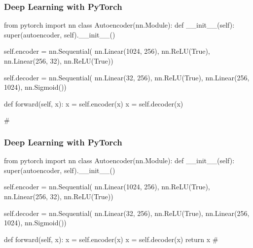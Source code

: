 \documentclass{beamer}
\begin{document}
\begin{frame}[fragile]\frametitle{Deep Learning with PyTorch} 
    \begin{pythoncode}
        from pytorch import nn
        class Autoencoder(nn.Module):
            def __init__(self):
                super(autoencoder, self).__init__()

                self.encoder = nn.Sequential(
                    nn.Linear(1024, 256),
                    nn.ReLU(True),
                    nn.Linear(256, 32),
                    nn.ReLU(True))

                self.decoder = nn.Sequential(
                    nn.Linear(32, 256),
                    nn.ReLU(True),
                    nn.Linear(256, 1024),
                    nn.Sigmoid())

            def forward(self, x):
                x = self.encoder(x)
                x = self.decoder(x)

        #
    \end{pythoncode}
    \vfill
\end{frame}

\begin{frame}[fragile]\frametitle{Deep Learning with PyTorch} 
    \begin{pythoncode}
        from pytorch import nn
        class Autoencoder(nn.Module):
            def __init__(self):
                super(autoencoder, self).__init__()

                self.encoder = nn.Sequential(
                    nn.Linear(1024, 256),
                    nn.ReLU(True),
                    nn.Linear(256, 32),
                    nn.ReLU(True))

                self.decoder = nn.Sequential(
                    nn.Linear(32, 256),
                    nn.ReLU(True),
                    nn.Linear(256, 1024),
                    nn.Sigmoid())

            def forward(self, x):
                x = self.encoder(x)
                x = self.decoder(x)
                return x
        #
    \end{pythoncode}
    \vfill
\end{frame}
\end{document}
